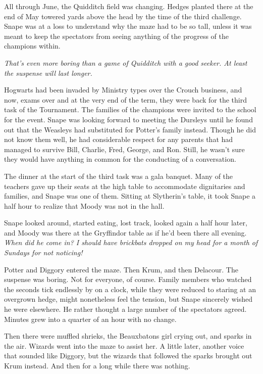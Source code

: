 All through June, the Quidditch field was changing. Hedges planted there at the end of May towered yards above the head by the time of the third challenge. Snape was at a loss to understand why the maze had to be so tall, unless it was meant to keep the spectators from seeing anything of the progress of the champions within.

\emph{That's even more boring than a game of Quidditch with a good seeker. At least the suspense will last longer.}

Hogwarts had been invaded by Ministry types over the Crouch business, and now, exams over and at the very end of the term, they were back for the third task of the Tournament. The families of the champions were invited to the school for the event. Snape was looking forward to meeting the Dursleys until he found out that the Weasleys had substituted for Potter's family instead. Though he did not know them well, he had considerable respect for any parents that had managed to survive Bill, Charlie, Fred, George, and Ron. Still, he wasn't sure they would have anything in common for the conducting of a conversation.

The dinner at the start of the third task was a gala banquet. Many of the teachers gave up their seats at the high table to accommodate dignitaries and families, and Snape was one of them. Sitting at Slytherin's table, it took Snape a half hour to realize that Moody was not in the hall.

Snape looked around, started eating, lost track, looked again a half hour later, and Moody was there at the Gryffindor table as if he'd been there all evening. \emph{When did he come in? I should have brickbats dropped on my head for a month of Sundays for not noticing!}

\sbreak

Potter and Diggory entered the maze. Then Krum, and then Delacour. The suspense was{\el} boring. Not for everyone, of course. Family members who watched the seconds tick endlessly by on a clock, while they were reduced to staring at an overgrown hedge, might nonetheless feel the tension, but Snape sincerely wished he were elsewhere. He rather thought a large number of the spectators agreed. Minutes grew into a quarter of an hour with no change.

Then there were muffled shrieks, the Beauxbatons girl crying out, and sparks in the air. Wizards went into the maze to assist her. A little later, another voice that sounded like Diggory, but the wizards that followed the sparks brought out Krum instead. And then for a long while there was nothing.

